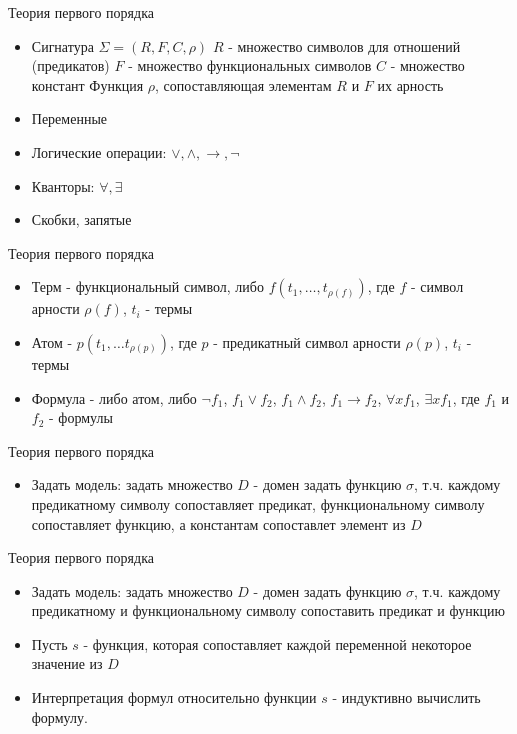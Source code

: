 \documentclass{beamer}
\begin{document}
\begin{frame}{Теория первого порядка}
\begin{itemize}
\item Сигнатура $\Sigma = (R, F, C, \rho)$\newline
$R$ - множество символов для отношений (предикатов)\newline
$F$ - множество функциональных символов\newline
$C$ - множество констант\newline
Функция $\rho$, сопоставляющая элементам $R$ и $F$ их арность
\item Переменные
\item Логические операции: $\vee, \wedge, \rightarrow, \lnot$
\item Кванторы: $\forall, \exists$
\item Скобки, запятые
\end{itemize}
\end{frame}

\begin{frame}{Теория первого порядка}
\begin{itemize}
\item Терм - функциональный символ, либо $f(t_1, \dots, t_{\rho (f)})$, где $f$ - символ арности $\rho (f)$, $t_i$ - термы
\item Атом - $p(t_1, \dots t_{\rho (p)})$, где $p$ - предикатный символ арности $\rho (p)$, $t_i$ - термы
\item Формула - либо атом, либо $\lnot f_1$, $f_1 \vee f_2$, $f_1 \wedge f_2$, $f_1 \rightarrow f_2$, $\forall x f_1$,
$\exists x f_1$, где $f_1$ и $f_2$ - формулы
\end{itemize}
\end{frame}

\begin{frame}{Теория первого порядка}
\begin{itemize}
\item Задать модель:\newline
задать множество $D$ - домен\newline
задать функцию $\sigma$, т.ч. каждому предикатному символу сопоставляет предикат, функциональному символу сопоставляет функцию,
а константам сопоставлет элемент из $D$
\end{itemize}
\end{frame}

\begin{frame}{Теория первого порядка}
\begin{itemize}
\item Задать модель:\newline
задать множество $D$ - домен\newline
задать функцию $\sigma$, т.ч. каждому предикатному и функциональному символу сопоставить предикат и функцию
\item Пусть $s$ - функция, которая сопоставляет каждой переменной некоторое значение из $D$
\item Интерпретация формул относительно функции $s$ - индуктивно вычислить формулу.
\end{itemize}
\end{frame}
\end{document}

